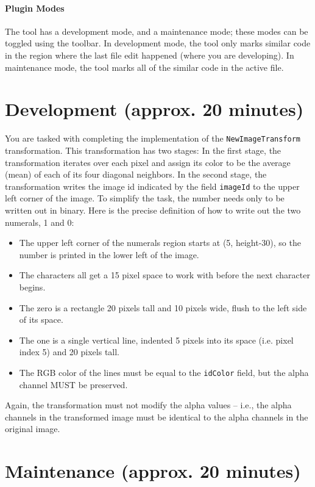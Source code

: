 \documentclass[12pt]{article}
\begin{document}
\paragraph{Plugin Modes}
The tool has a development mode, and a maintenance mode; these modes
can be toggled using the toolbar. In development mode, the tool only
marks similar code in the region where the last file edit happened
(where you are developing). In maintenance mode, the tool marks all of
the similar code in the active file.

\section{Development (approx. 20 minutes)}

You are tasked with completing the implementation of the
\verb|NewImageTransform| transformation.  This transformation has two
stages: In the first stage, the transformation iterates over each
pixel and assign its color to be the average (mean) of each of its
four diagonal neighbors. In the second stage, the transformation
writes the image id indicated by the field \verb|imageId| to the upper
left corner of the image.  To simplify the task, the number needs only
to be written out in binary.  Here is the precise definition of how to
write out the two numerals, 1 and 0:

\begin{itemize}
\item The upper left corner of the numerals region starts at (5,
  height-30), so the number is printed in the lower left of the image.
\item The characters all get a 15 pixel space to work with before the
  next character begins.
\item The zero is a rectangle 20 pixels tall and 10 pixels wide, flush
  to the left side of its space.
\item The one is a single vertical line, indented 5 pixels into its
  space (i.e. pixel index 5) and 20 pixels tall.
\item The RGB color of the lines must be equal to the \verb|idColor|
  field, but the alpha channel MUST be preserved.
\end{itemize}

Again, the transformation must not modify the alpha values -- i.e.,
the alpha channels in the transformed image must be identical to the
alpha channels in the original image.

\section{Maintenance (approx. 20 minutes)}
\end{document}
